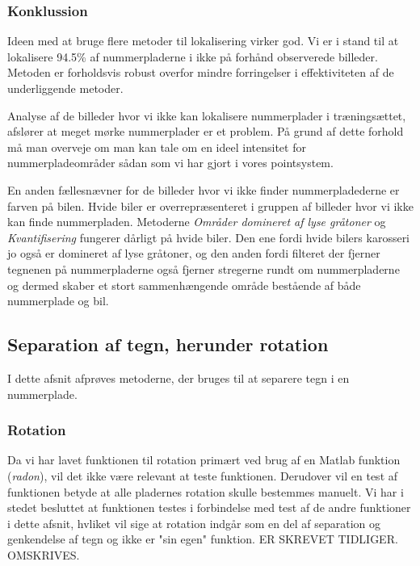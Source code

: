 \subsubsection{Konklussion}
Ideen med at bruge flere metoder til lokalisering virker god. Vi er i stand til at lokalisere 94.5\% af nummerpladerne i ikke på forhånd observerede billeder. Metoden er forholdsvis robust overfor mindre forringelser i effektiviteten af de underliggende metoder.

Analyse af de billeder hvor vi ikke kan lokalisere nummerplader i træningsættet, afslører at meget mørke nummerplader er et problem. På grund af dette forhold må man overveje om man kan tale om en ideel intensitet for nummerpladeområder sådan som vi har gjort i vores pointsystem.

En anden fællesnævner for de billeder hvor vi ikke finder nummerpladederne er farven på bilen. Hvide biler er overrepræsenteret i gruppen af billeder hvor vi ikke kan finde nummerpladen. Metoderne \textit{Områder domineret af lyse gråtoner} og \textit{Kvantifisering} fungerer dårligt på hvide biler. Den ene fordi hvide bilers karosseri jo også er domineret af lyse gråtoner, og den anden fordi filteret der fjerner tegnenen på nummerpladerne også fjerner stregerne rundt om nummerpladerne og dermed skaber et stort sammenhængende område bestående af både nummerplade og bil. 

 



\subsection{Separation af tegn, herunder rotation}


I dette afsnit afprøves metoderne, der bruges til at separere tegn i en nummerplade.

\subsubsection*{Rotation}

Da vi har lavet funktionen til rotation primært ved brug af en Matlab funktion (\textit{radon}), vil det ikke være relevant at teste funktionen. Derudover vil en test af funktionen betyde at alle pladernes rotation skulle bestemmes manuelt. Vi har i stedet besluttet at funktionen testes i forbindelse med test af de andre funktioner i dette afsnit, hvliket vil sige at rotation indgår som en del af separation og genkendelse af tegn og ikke er "sin egen" funktion. ER SKREVET TIDLIGER. OMSKRIVES.

